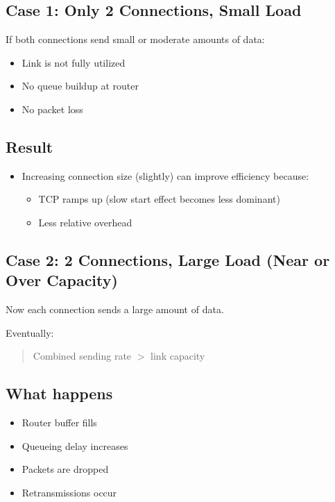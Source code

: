\subsection{Case 1: Only 2 Connections, Small Load}

If both connections send small or moderate amounts of data:

\begin{itemize}
    \item Link is not fully utilized
    \item No queue buildup at router
    \item No packet loss
\end{itemize}

\subsection*{Result}
\begin{itemize}
    \item Increasing connection size (slightly) can improve efficiency because:
    \begin{itemize}
        \item TCP ramps up (slow start effect becomes less dominant)
        \item Less relative overhead
    \end{itemize}
\end{itemize}


\subsection{Case 2: 2 Connections, Large Load (Near or Over Capacity)}

Now each connection sends a large amount of data.

Eventually:

\begin{quote}
Combined sending rate $>$ link capacity
\end{quote}

\subsection*{What happens}
\begin{itemize}
    \item Router buffer fills
    \item Queueing delay increases
    \item Packets are dropped
    \item Retransmissions occur
\end{itemize}

